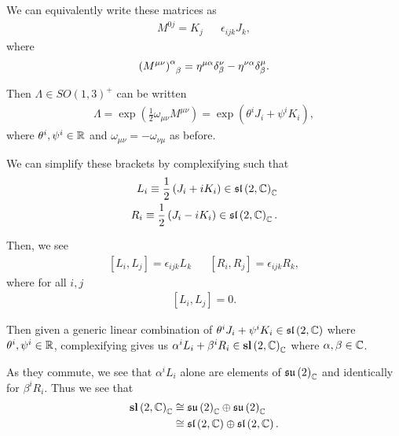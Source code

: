 
We can equivalently write these matrices as
\begin{align}
    M^{0j} = K_j && \epsilon_{ijk} J_k
,\end{align}
where
\begin{align}
    \tensor{\left( M^{\mu \nu} \right) }{^{\alpha}_{\beta}} = \eta^{\mu \alpha} \delta^{\nu}_{\beta} - \eta^{\nu \alpha} \delta^{\mu}_{\beta}
.\end{align}

Then $\Lambda \in SO \left( 1,3 \right)^{+}$ can be written
\begin{align}
    \Lambda = \exp \left( \frac{1}{2} \omega_{\mu \nu} M^{\mu \nu} \right) = \exp \left( \theta^{i} J_i + \psi^{i} K_i \right) 
,\end{align}
where $\theta^{i}, \psi^{i} \in \mathbb{R}$ and $\omega_{\mu \nu} = - \omega_{\nu \mu}$ as before.

We can simplify these brackets by complexifying such that
\begin{align}
    L_i \equiv \frac{1}{2} \left( J_i + i K_i \right) \in \mathfrak{sl}\left( 2,\mathbb{C} \right)_{\mathbb{C}} \\
    R_i \equiv \frac{1}{2} \left( J_i - i K_i \right) \in \mathfrak{sl}\left( 2,\mathbb{C} \right)_{\mathbb{C}}
.\end{align}

Then, we see
\begin{align}
    \left[ L_i, L_j \right] = \epsilon_{ijk} L_{k} && \left[ R_{i}, R_{j} \right] = \epsilon_{ijk} R_{k}
,\end{align}
where for all $i,j$
\begin{align}
    \left[ L_{i}, L_{j} \right] = 0
.\end{align}

Then given a generic linear combination of $\theta^{i} J_i + \psi^{i} K_i \in \mathfrak{sl}\left( 2, \mathbb{C} \right) $ where $\theta^{i}, \psi^{i} \in \mathbb{R}$, complexifying gives us $\alpha^{i} L_i + \beta^{i} R_i \in \textbf{sl}\left( 2, \mathbb{C} \right)_{\mathbb{C}}$ where $\alpha, \beta \in \mathbb{C}$.

As they commute, we see that $\alpha^{i}L_i$ alone are elements of $\mathfrak{su}\left( 2 \right)_{\mathbb{C}}$ and identically for $\beta^{i} R_i$. Thus we see that
\begin{align}
    \textbf{sl}\left( 2,\mathbb{C} \right)_{\mathbb{C}} &\cong \mathfrak{su}\left( 2 \right)_{\mathbb{C}} \oplus \mathfrak{su}\left( 2 \right)_{\mathbb{C}} \\
    &\cong \mathfrak{sl}\left( 2,\mathbb{C} \right) \oplus \mathfrak{sl}\left( 2,\mathbb{C} \right) 
.\end{align}

